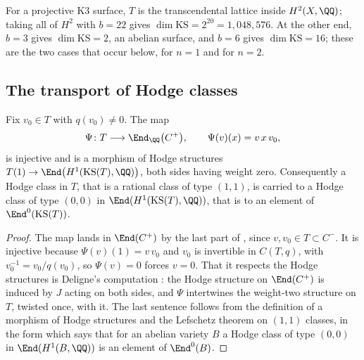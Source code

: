 \begin{example}\label{ex:ksdims}
For a projective K3 surface, $T$ is the transcendental lattice inside
$H^{2}(X,\QQ)$; taking all of $H^{2}$ with $b=22$ gives
$\dim\mathrm{KS}=2^{20}=1{,}048{,}576$. At the other end, $b=3$ gives
$\dim\mathrm{KS}=2$, an abelian surface, and $b=6$ gives
$\dim\mathrm{KS}=16$; these are the two cases that occur below, for $n=1$ and
for $n=2$.
\end{example}

\subsection{The transport of Hodge classes}

\begin{proposition}\label{prop:ksembed}
Fix $v_{0}\in T$ with $q(v_{0})\ne0$. The map
\[
  \Psi\colon T\longrightarrow\End_{\QQ}\bigl(C^{+}\bigr),
  \qquad
  \Psi(v)(x)=v\,x\,v_{0},
\]
is injective and is a morphism of Hodge structures
$T(1)\to\End\bigl(H^{1}(\mathrm{KS}(T),\QQ)\bigr)$, both sides having weight
zero. Consequently a Hodge class in $T$, that is a rational class of type
$(1,1)$, is carried to a Hodge class of type $(0,0)$ in
$\End(H^{1}(\mathrm{KS}(T),\QQ))$, that is to an element of
$\End^{0}(\mathrm{KS}(T))$.
\end{proposition}

\begin{proof}
The map lands in $\End(C^{+})$ by the last part of , since
$v,v_{0}\in T\subset C^{-}$. It is injective because $\Psi(v)(1)=v\,v_{0}$
and $v_{0}$ is invertible in $C(T,q)$, with $v_{0}^{-1}=v_{0}/q(v_{0})$, so
$\Psi(v)=0$ forces $v=0$. That it respects the Hodge structures is
Deligne's computation \cite[\S4]{Del72}: the Hodge structure on
$\End(C^{+})$ is induced by $J$ acting on both sides, and $\Psi$ intertwines
the weight-two structure on $T$, twisted once, with it. The last sentence
follows from the definition of a morphism of Hodge structures and the
Lefschetz theorem on $(1,1)$ classes, in the form which says that for an
abelian variety $B$ a Hodge class of type $(0,0)$ in $\End(H^{1}(B,\QQ))$ is
an element of $\End^{0}(B)$.
\end{proof}

